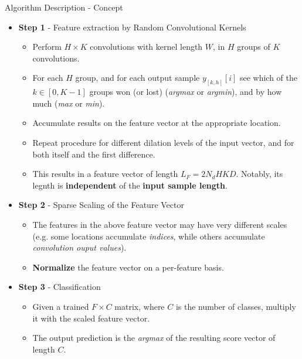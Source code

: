 \documentclass[10pt,aspectratio=169]{beamer}
\begin{document}
\begin{frame}[fragile]{Algorithm Description - Concept}
	\begin{itemize}
		\item \textbf{Step 1} - Feature extraction by Random Convolutional Kernels

		\begin{itemize}
			\item Perform $H \times K$ convolutions with kernel length $W$, in $H$ groups of $K$ convolutions.
			\item For each $H$ group, and for each output sample $y_{[k,h]}[i]$ see which of the $k \in [0, K-1]$ groups won (or lost) (\textit{argmax} or \textit{argmin}), and by how much (\textit{max} or \textit{min}).
			\item Accumulate results on the feature vector at the appropriate location.
			\item Repeat procedure for different dilation levels of the input vector, and for both itself and the first difference.
			\item This results in a feature vector of length $L_F = 2N_dHKD$. Notably, its legnth is \textbf{independent} of the \textbf{input sample length}.
		\end{itemize}

		\item \textbf{Step 2} - Sparse Scaling of the Feature Vector

		\begin{itemize}
			\item The features in the above feature vector may have very different scales (e.g. some locations accumulate \textit{indices}, while others accumulate \textit{convolution ouput values}).
			\item \textbf{Normalize} the feature vector on a per-feature basis.
		\end{itemize}
		
		\item \textbf{Step 3} - Classification

		\begin{itemize}
			\item Given a trained $F \times C$ matrix, where $C$ is the number of classes, multiply it with the scaled feature vector.
			\item The output prediction is the \textit{argmax} of the resulting	score vector of length $C$.
		\end{itemize}
	\end{itemize}
\end{frame}
\end{document}

